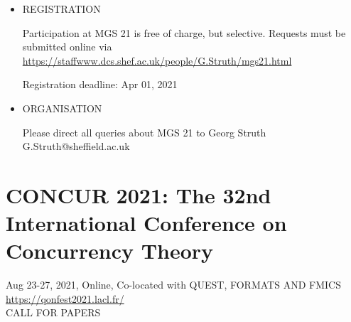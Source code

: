 \documentclass[prodmode,acmtecs]{acmsmall} %
\begin{document}
\begin{itemize}
\item  REGISTRATION 
 
  Participation at MGS 21 is free of charge, but selective. Requests must be submitted online via \href{https://staffwww.dcs.shef.ac.uk/people/G.Struth/mgs21.html}{https://staffwww.dcs.shef.ac.uk/people/G.Struth/mgs21.html} 
 
Registration deadline: Apr 01, 2021 
 
\item  ORGANISATION 
 
  Please direct all queries about MGS 21 to Georg Struth G.Struth@sheffield.ac.uk 
 
\end{itemize}\section{CONCUR 2021: The 32nd International Conference on Concurrency Theory}\label{CONCUR2021}  Aug 23-27, 2021, Online, Co-located with QUEST, FORMATS AND FMICS\\ 
  \href{https://qonfest2021.lacl.fr/}{https://qonfest2021.lacl.fr/}\\ 
CALL FOR PAPERS 
\end{document}
